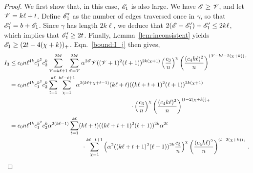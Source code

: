 \begin{proof}
We first show that, in this case, $\mathscr{E}_1$ is also large. 
We have 
$\mathscr{E} \geq \mathscr{V}$,
and let $\mathscr{V} = k\ell + t$.
Define
$\mathscr{E}_1'$ as the number of edges 
traversed once in $\gamma$, 
so that 
$\mathscr{E}_1' = b + \mathscr{E}_1$.
Since $\gamma$ has length $2k \ell$, we deduce that
$2 (\mathscr{E} - \mathscr{E}'_1) + \mathscr{E}'_1 \leq 2k\ell$,
which implies that $\mathscr{E}'_1 \geq 2t$.
Finally, Lemma~\ref{lem:inconsistent}
yields
$\mathscr{E}_1 \geq (2t - 4 (\chi + k))_+$.
Eqn.~\eqref{bound:I_j} then gives,
\begin{align*}
I_3 
&\leq 
c_0 n
\ell^{4k} 
c_1^{ k^2}
c_2^k
\sum_{\nvertex=k\ell+1}^{2k\ell} 
\sum_{\nedge=\nvertex}^{2k\ell} 
\alpha^{2\nedge}
\nvertex
((\nvertex + 1)^2 (\ell + 1))^{2k(\chi + 1)}
\left( \frac{c_3}{n} \right)^\chi 
\left( \frac{(c_4 k \ell)^2}{n} \right)^
{(\nvertex - k\ell - 2(\chi+k))_+} 
\nonumber \\
&=
c_0 n
\ell^{4k} 
c_1^{ k^2}
c_2^k
\sum_{t=1}^{k\ell} 
\sum_{\chi=1}^{k\ell - t+1} 
\alpha^{2 (k\ell + \chi + t-1)}
(k\ell + t)
((k\ell + t + 1)^2 (\ell + 1))^{2k(\chi + 1)}\\ 
& \qquad\qquad\qquad\qquad\qquad\qquad\qquad\qquad\qquad\qquad \cdot
\left( \frac{c_3}{n} \right)^{\chi} 
\left( \frac{(c_4 k \ell)^2}{n} \right)^{(t - 2(\chi+k))_+}
\nonumber \\
&=
c_0
n
\ell^{4k} 
c_1^{ k^2}
c_2^k
\alpha^{2 (k\ell-1)}
\sum_{t=1}^{k\ell} 
(k\ell + t)
((k\ell + t + 1)^2 (\ell + 1))^{2k}
\alpha^{2t} 
\\
& \qquad\qquad\qquad\qquad\qquad\qquad \cdot
\sum_{\chi=1}^{k\ell - t+1}
\left( \alpha^2 ((k\ell + t + 1)^2 (\ell + 1))^{2k} \frac{c_3}{n} \right)^{\chi} 
\left( \frac{(c_4 k \ell)^2}{n} \right)^{(t - 2(\chi+k))_+}.
\end{align*}


\end{proof}
